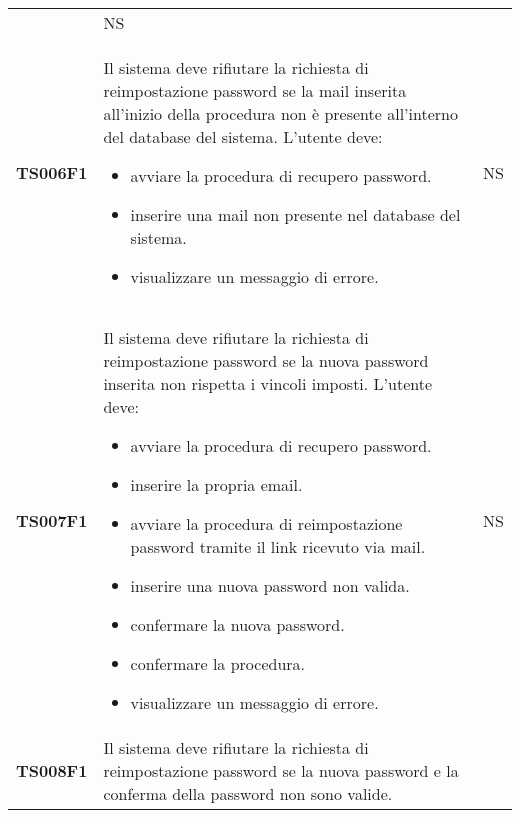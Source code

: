 \documentclass[../piano-di-qualifica.tex]{subfiles}
\begin{document}
\begin{longtable}[H]{>{\centering\bfseries}m{3cm} >{}m{10cm} >{\centering\arraybackslash}m{3cm}}
                     & NS                                                                                                                                                                                                                                                               \\
  TS006F1            & Il sistema deve rifiutare la richiesta di reimpostazione password se la mail inserita all'inizio della procedura non è presente all'interno del database del sistema. \newline
  L'utente deve:
  \begin{itemize}
    \item avviare la procedura di recupero password.
    \item inserire una mail non presente nel database del sistema.
    \item visualizzare un messaggio di errore.
  \end{itemize}
                     & NS                                                                                                                                                                                                                                                               \\
  TS007F1            & Il sistema deve rifiutare la richiesta di reimpostazione password se la nuova password inserita non rispetta i vincoli imposti. \newline
  L'utente deve:
  \begin{itemize}
    \item avviare la procedura di recupero password.
    \item inserire la propria email.
    \item avviare la procedura di reimpostazione password tramite il link ricevuto via mail.
    \item inserire una nuova password non valida.
    \item confermare la nuova password.
    \item confermare la procedura.
    \item visualizzare un messaggio di errore.
  \end{itemize}
                     & NS                                                                                                                                                                                                                                                               \\
  TS008F1            & Il sistema deve rifiutare la richiesta di reimpostazione password se la nuova password e la conferma della password non sono valide. \newline

\end{longtable}
\end{document}
